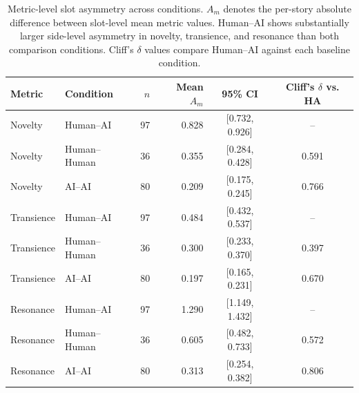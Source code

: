 \documentclass[11pt]{article}
\begin{document}
\begin{table}[t] \centering \small \setlength{\tabcolsep}{4pt} \begin{tabular}{llrrcc} \toprule Metric & Condition & $n$ & Mean $A_m$ & 95\% CI & Cliff's $\delta$ vs. HA \\ \midrule Novelty& Human--AI & 97 & 0.828 & [0.732, 0.926] & -- \\ Novelty& Human--Human & 36 & 0.355 & [0.284, 0.428] & 0.591 \\ Novelty& AI--AI & 80 & 0.209 & [0.175, 0.245] & 0.766 \\ \addlinespace Transience & Human--AI & 97 & 0.484 & [0.432, 0.537] & -- \\ Transience & Human--Human & 36 & 0.300 & [0.233, 0.370] & 0.397 \\ Transience & AI--AI & 80 & 0.197 & [0.165, 0.231] & 0.670 \\ \addlinespace Resonance & Human--AI & 97 & 1.290 & [1.149, 1.432] & -- \\ Resonance & Human--Human & 36 & 0.605 & [0.482, 0.733] & 0.572 \\ Resonance & AI--AI & 80 & 0.313 & [0.254, 0.382] & 0.806 \\ \bottomrule \end{tabular} \caption{Metric-level slot asymmetry across conditions. $A_m$ denotes the per-story absolute difference between slot-level mean metric values. Human--AI shows substantially larger side-level asymmetry in novelty, transience, and resonance than both comparison conditions. Cliff's $\delta$ values compare Human--AI against each baseline condition.} \label{tab:metric-asymmetry-full} \end{table}
\end{document}
